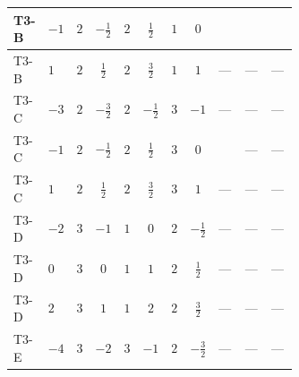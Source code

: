 \documentclass[8pt]{article}
\begin{document}
\begin{landscape}
\begin{longtable}{@{}llcccccc >{\raggedright\arraybackslash}p{0.21\linewidth} >{\raggedright\arraybackslash}p{0.21\linewidth} >{\raggedright\arraybackslash}p{0.21\linewidth}@{}}
T3-B & $-1$ & $2$ & $-\frac{1}{2}$ & $2$ & $\frac{1}{2}$ & $1$ & $0$ & \scriptsize\adjustbox{max width=\linewidth}{$\begin{gathered} +{\lambda_{HS_2}^{(A)}} \left(-\frac{3}{8} \operatorname{Tr}\!\left({y_2}\,\left({y_1}\right)^{\dagger}\right)-\frac{3 {\lambda_{H H^\dagger S_1^\dagger S_2^\dagger}^{\rm Cross}}}{2}-\frac{3 {\lambda_{10}}}{4}\right)\end{gathered}$} & \scriptsize\adjustbox{max width=\linewidth}{$\begin{gathered} +{\lambda_{H H^\dagger S_1^\dagger S_2^\dagger}^{\rm Cross}} (T_{\nu}^{(1)}+T_{\nu}^{(2)}+6 \operatorname{Tr}\!\left({Y_d}\,\left({Y_d}\right)^{\dagger}\right)+2 \operatorname{Tr}\!\left({Y_e}\,\left({Y_e}\right)^{\dagger}\right)+6 \operatorname{Tr}\!\left({Y_u}\,\left({Y_u}\right)^{\dagger}\right))\end{gathered}$} & \scriptsize\adjustbox{max width=\linewidth}{$\begin{gathered} -4 \operatorname{Tr}\!\left({y_2}\,\left({y_1}\right)^{\dagger}\,{Y_e}\,\left({Y_e}\right)^{\dagger}\right)\end{gathered}$} \\
\midrule
T3-B & $1$ & $2$ & $\frac{1}{2}$ & $2$ & $\frac{3}{2}$ & $1$ & $1$ & --- & --- & --- \\
\midrule
T3-C & $-3$ & $2$ & $-\frac{3}{2}$ & $2$ & $-\frac{1}{2}$ & $3$ & $-1$ & --- & --- & --- \\
\midrule
T3-C & $-1$ & $2$ & $-\frac{1}{2}$ & $2$ & $\frac{1}{2}$ & $3$ & $0$ & \scriptsize\adjustbox{max width=\linewidth}{$\begin{gathered} +{\lambda_{HS_2}^{(A)}} \left(-\frac{9}{16} \operatorname{Tr}\!\left({y_2}\,\left({y_1}\right)^{\dagger}\right)-\frac{3 {\lambda_{H H^\dagger S_1^\dagger S_2^\dagger}^{\rm Cross}}}{2}-\frac{3 {\lambda_{10}}}{4}\right)\end{gathered}$} & --- & --- \\
\midrule
T3-C & $1$ & $2$ & $\frac{1}{2}$ & $2$ & $\frac{3}{2}$ & $3$ & $1$ & --- & --- & --- \\
\midrule
T3-D & $-2$ & $3$ & $-1$ & $1$ & $0$ & $2$ & $-\frac{1}{2}$ & --- & --- & --- \\
\midrule
T3-D & $0$ & $3$ & $0$ & $1$ & $1$ & $2$ & $\frac{1}{2}$ & --- & --- & --- \\
\midrule
T3-D & $2$ & $3$ & $1$ & $1$ & $2$ & $2$ & $\frac{3}{2}$ & --- & --- & --- \\
\midrule
T3-E & $-4$ & $3$ & $-2$ & $3$ & $-1$ & $2$ & $-\frac{3}{2}$ & --- & --- & --- \\

\end{longtable}
\end{landscape}
\end{document}
